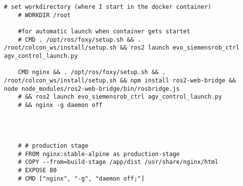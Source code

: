 \begin{lstlisting}[language=docker,
	caption={Dockerfile}, 
	label={code:DockerTestumgebung}]
	# set workdirectory (where I start in the docker container)
	# WORKDIR /root

	#for automatic launch when container gets startet 
	# CMD . /opt/ros/foxy/setup.sh && . /root/colcon_ws/install/setup.sh && ros2 launch evo_siemensrob_ctrl agv_control_launch.py

	CMD nginx && . /opt/ros/foxy/setup.sh && . /root/colcon_ws/install/setup.sh && npm install ros2-web-bridge && node node_modules/ros2-web-bridge/bin/rosbridge.js 
	# && ros2 launch evo_siemensrob_ctrl agv_control_launch.py 
	# && nginx -g daemon off




	# # production stage
	# FROM nginx:stable-alpine as production-stage
	# COPY --from=build-stage /app/dist /usr/share/nginx/html
	# EXPOSE 80
	# CMD ["nginx", "-g", "daemon off;"]
\end{lstlisting}